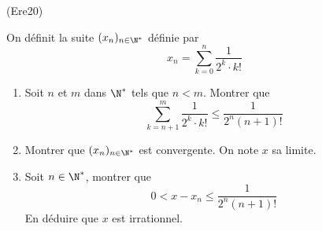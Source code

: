 \begin{tiny}(Ere20)\end{tiny} On définit la suite $(x_{n})_{n\in \N^{*}}$ d{\'e}finie par
\begin{displaymath}
x_{n}=\sum_{k=0}^{n}\frac{1}{2^{k}\cdot k!} 
\end{displaymath}
\begin{enumerate}
 \item Soit  $n$ et $m$ dans $\N^*$ tels que $n<m$. Montrer que
\begin{displaymath}
\sum_{k=n+1}^{m}\frac{1}{2^{k}\cdot k!} \leq \frac{1}{2^n (n+1)!}
\end{displaymath}
\item Montrer que $(x_{n})_{n\in \N^{*}}$ est convergente. On note $x$ sa limite.
\item Soit $n\in \N^*$, montrer que
\begin{displaymath}
 0< x- x_n \leq \frac{1}{2^n (n+1)!}
\end{displaymath}
En déduire que $x$ est irrationnel.
\end{enumerate}
